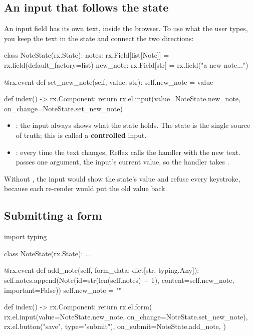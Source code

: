 \subsection{An input that follows the state}

An input field has its own text, inside the browser. To use what the user types, you keep the text in the state and connect the two directions:

\begin{py}
class NoteState(rx.State):
	notes: rx.Field[list[Note]] = rx.field(default_factory=list)
	new_note: rx.Field[str] = rx.field("a new note...")

	@rx.event
	def set_new_note(self, value: str):
		self.new_note = value


def index() -> rx.Component:
	return rx.el.input(value=NoteState.new_note, on_change=NoteState.set_new_note)
\end{py}

\begin{itemize}
\item {}: the input always shows what the state holds. The state is the single source of truth; this is called a \textbf{controlled} input.
\item {}: every time the text changes, Reflex calls the handler with the new text.  passes one argument, the input's current value, so the handler takes .
\end{itemize}

Without , the input would show the state's value and refuse every keystroke, because each re-render would put the old value back.

\subsection{Submitting a form}

\begin{py}
import typing


class NoteState(rx.State):
	...

	@rx.event
	def add_note(self, form_data: dict[str, typing.Any]):
		self.notes.append(Note(id=str(len(self.notes) + 1), content=self.new_note, important=False))
		self.new_note = ""


def index() -> rx.Component:
	return rx.el.form(
		rx.el.input(value=NoteState.new_note, on_change=NoteState.set_new_note),
		rx.el.button("save", type="submit"),
		on_submit=NoteState.add_note,
	)
\end{py}

